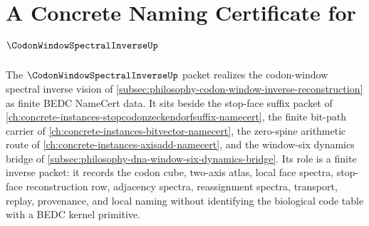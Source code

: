 \chapter{A Concrete Naming Certificate for $\CodonWindowSpectralInverseUp$}
\label{ch:concrete-instances-codon-window-spectral-inverse-namecert}

The $\CodonWindowSpectralInverseUp$ packet realizes the codon-window spectral inverse vision of \autoref{subsec:philosophy-codon-window-inverse-reconstruction} as finite BEDC NameCert data. It sits beside the stop-face suffix packet of \autoref{ch:concrete-instances-stopcodonzeckendorfsuffix-namecert}, the finite bit-path carrier of \autoref{ch:concrete-instances-bitvector-namecert}, the zero-spine arithmetic route of \autoref{ch:concrete-instances-axisadd-namecert}, and the window-six dynamics bridge of \autoref{subsec:philosophy-dna-window-six-dynamics-bridge}. Its role is a finite inverse packet: it records the codon cube, two-axis atlas, local face spectra, stop-face reconstruction row, adjacency spectra, reassignment spectra, transport, replay, provenance, and local naming without identifying the biological code table with a BEDC kernel primitive.

